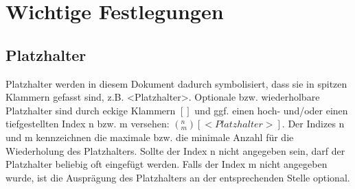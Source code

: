 \chapter{Wichtige Festlegungen}\label{chap:Wichtige Festlegungen}
\section{Platzhalter}
Platzhalter werden in diesem Dokument dadurch symbolisiert, dass sie in spitzen Klammern gefasst sind, z.B. <Platzhalter>. Optionale bzw. wiederholbare Platzhalter sind durch eckige Klammern $[ ]$ und ggf. einen hoch- und/oder einen tiefgestellten Index n bzw. m versehen:  $(_m^n) [<Platzhalter>]$. Der Indizes n und m kennzeichnen die maximale bzw. die minimale Anzahl für die Wiederholung des Platzhalters. Sollte der Index n nicht angegeben sein, darf der Platzhalter beliebig oft eingefügt werden. Falls der Index m nicht angegeben wurde, ist die Ausprägung des Platzhalters an der entsprechenden Stelle optional. 
